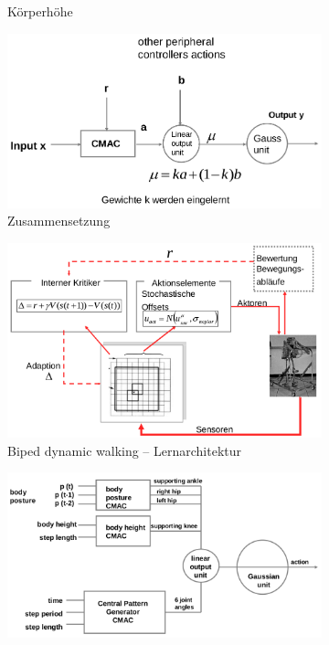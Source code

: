 \begin{figure}
\begin{subfigure}{.5\textwidth}
		\caption{Körperhöhe}
		\label{ch:09:fig:koerperhoehe}
	\end{subfigure}
	\begin{subfigure}{.5\textwidth}
		\centering
		\includegraphics[width=\textwidth]{figures/zusammensetzung.png}
		\caption{Zusammensetzung}
		\label{ch:09:fig:zusammensetzung}
	\end{subfigure}
	\begin{subfigure}{.5\textwidth}
		\centering
		\includegraphics[width=\textwidth]{figures/bdw_lernarchitektur.png}
		\caption{Biped dynamic walking -- Lernarchitektur}
		\label{ch:09:fig:bdw-lernarchitektur}
	\end{subfigure}
	\begin{subfigure}{.5\textwidth}
		\centering
		\includegraphics[width=\textwidth]{figures/gesamtuebersicht_aktor.png}

\end{subfigure}
\end{figure}
